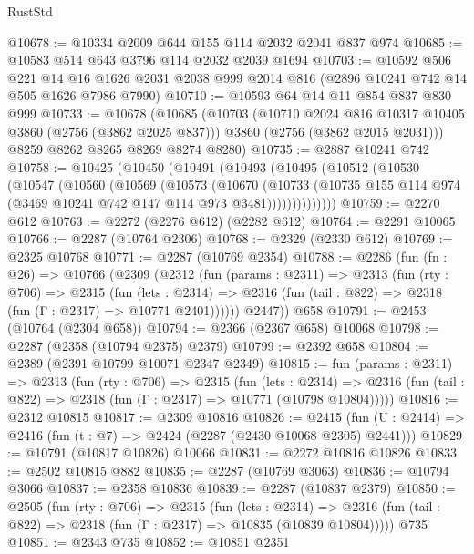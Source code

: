 \begin{lexlean}{RustStd}
\begin{coremodule}
@10678 := @10334 @2009 @644 @155 @114 @2032 @2041 @837 @974
@10685 := @10583 @514 @643 @3796 @114 @2032 @2039 @1694
@10703 := @10592
    @506
    @221
    @14
    @16
    @1626
    @2031
    @2038
    @999
    @2014
    @816
    (@2896 @10241 @742 @14 @505 @1626 @7986 @7990)
@10710 := @10593 @64 @14 @11 @854 @837 @830 @999
@10733 := @10678
    (@10685
      (@10703
        (@10710 @2024 @816 @10317 @10405 @3860 (@2756 (@3862 @2025 @837)))
        @3860
        (@2756 (@3862 @2015 @2031)))
      @8259
      @8262
      @8265
      @8269
      @8274
      @8280)
@10735 := @2887 @10241 @742
@10758 := @10425
    (@10450
      (@10491
        (@10493
          (@10495
            (@10512
              (@10530
                (@10547
                  (@10560
                    (@10569
                      (@10573
                        (@10670
                          (@10733
                            (@10735
                              @155
                              @114
                              @974
                              (@3469 @10241 @742 @147 @114 @973 @3481))))))))))))))
@10759 := @2270 @612
@10763 := @2272 (@2276 @612) (@2282 @612)
@10764 := @2291 @10065
@10766 := @2287 (@10764 @2306)
@10768 := @2329 (@2330 @612)
@10769 := @2325 @10768
@10771 := @2287 (@10769 @2354)
@10788 := @2286
    (fun (fn : @26) =>
    @10766
      (@2309
        (@2312
          (fun (params : @2311) =>
          @2313
            (fun (rty : @706) =>
            @2315
              (fun (lets : @2314) =>
              @2316 (fun (tail : @822) => @2318 (fun (Γ : @2317) => @10771 @2401))))))
        @2447))
    @658
@10791 := @2453 (@10764 (@2304 @658))
@10794 := @2366 (@2367 @658) @10068
@10798 := @2287 (@2358 (@10794 @2375) @2379)
@10799 := @2392 @658
@10804 := @2389 (@2391 @10799 @10071 @2347 @2349)
@10815 := fun (params : @2311) =>
  @2313
    (fun (rty : @706) =>
    @2315
      (fun (lets : @2314) =>
      @2316 (fun (tail : @822) => @2318 (fun (Γ : @2317) => @10771 (@10798 @10804)))))
@10816 := @2312 @10815
@10817 := @2309 @10816
@10826 := @2415
    (fun (U : @2414) => @2416 (fun (t : @7) => @2424 (@2287 (@2430 @10068 @2305) @2441)))
@10829 := @10791 (@10817 @10826) @10066
@10831 := @2272 @10816 @10826
@10833 := @2502 @10815 @882
@10835 := @2287 (@10769 @3063)
@10836 := @10794 @3066
@10837 := @2358 @10836
@10839 := @2287 (@10837 @2379)
@10850 := @2505
    (fun (rty : @706) =>
    @2315
      (fun (lets : @2314) =>
      @2316 (fun (tail : @822) => @2318 (fun (Γ : @2317) => @10835 (@10839 @10804)))))
    @735
@10851 := @2343 @735
@10852 := @10851 @2351

\end{coremodule}
\end{lexlean}
